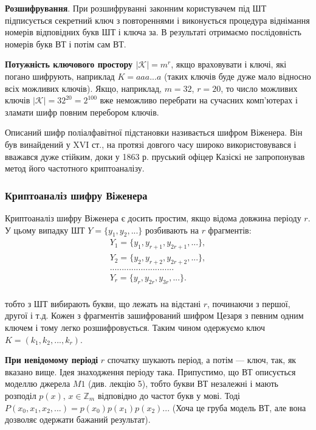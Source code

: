 \textbf{Розшифрування}. При розшифруванні законним користувачем під ШТ
підписується секретний ключ з повтореннями і виконується процедура
віднімання номерів відповідних букв ШТ і ключа за.
В результаті отримаємо послідовність номерів букв ВТ і потім сам ВТ.

\textbf{Потужність ключового простору $|\mathcal{K}| = m^r$}, якщо враховувати і
ключі, які погано шифрують, наприклад $K = aaa...a$ (таких ключів буде
дуже мало відносно всіх можливих ключів). Якщо, наприклад, $m=32$, $r = 20$,
то число можливих ключів $|\mathcal{K}| = 32^{20} = 2^{100}$ вже неможливо перебрати на
сучасних комп’ютерах і зламати шифр повним перебором ключів.

Описаний шифр поліалфавітної підстановки називається шифром
Віженера. Він був винайдений у XVI ст., на протязі довгого часу широко
використовувався і вважався дуже стійким, доки у 1863 р. пруський офіцер
Казіскі не запропонував метод його частотного криптоаналізу.

\subsubsection{Криптоаналіз шифру Віженера}

Криптоаналіз шифру Віженера є досить простим, якщо відома
довжина періоду $r$. У цьому випадку ШТ $Y = \{y_1, y_2, ...\}$ розбивають на
$r$ фрагментів:
$$\begin{array}{l}
    Y_1 = \{y_1, y_{r+1}, y_{2r+1}, ... \},  \\
    Y_2 = \{y_2, y_{r+2}, y_{2r+2}, ... \},  \\
    ... ... ... ... ... ... ... ... ...  \\
    Y_r = \{y_r, y_{2r}, y_{3r}, ... \}.  \\
\end{array}$$

тобто з ШТ вибирають букви, що лежать на відстані $r$, починаючи з першої,
другої і т.д. Кожен з фрагментів зашифрований шифром Цезаря з певним
одним ключем і тому легко розшифровується. Таким чином одержуємо ключ
$K = (k_1, k_2, ..., k_r)$.

\textbf{При невідомому періоді} $r$ спочатку шукають період, а потім --- ключ,
так, як вказано вище. Ідея знаходження періоду така. Припустимо, що ВТ
описується моделлю джерела $M1$ (див. лекцію 5), тобто букви ВТ незалежні і
мають розподіл $p(x)$, $x \in \mathbb{Z}_m$
відповідно до частот букв у мові. Тоді
$P(x_0, x_1, x_2, ...) = p(x_0) p(x_1) p(x_2) ...$
(Хоча це груба модель ВТ, але вона
дозволяє одержати бажаний результат).

